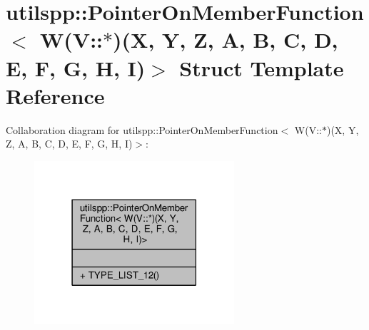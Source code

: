 \hypertarget{structutilspp_1_1PointerOnMemberFunction_3_01W_07V_1_1_5_08_07X_00_01Y_00_01Z_00_01A_00_01B_00_0bbd85fb2705c5ddb5a380fdcfc065534}{\section{utilspp\-:\-:Pointer\-On\-Member\-Function$<$ W(V\-:\-:$\ast$)(X, Y, Z, A, B, C, D, E, F, G, H, I)$>$ Struct Template Reference}
\label{structutilspp_1_1PointerOnMemberFunction_3_01W_07V_1_1_5_08_07X_00_01Y_00_01Z_00_01A_00_01B_00_0bbd85fb2705c5ddb5a380fdcfc065534}
}


Collaboration diagram for utilspp\-:\-:Pointer\-On\-Member\-Function$<$ W(V\-:\-:$\ast$)(X, Y, Z, A, B, C, D, E, F, G, H, I)$>$\-:
\nopagebreak
\begin{figure}[H]
\begin{center}
\leavevmode
\includegraphics[width=210pt]{structutilspp_1_1PointerOnMemberFunction_3_01W_07V_1_1_5_08_07X_00_01Y_00_01Z_00_01A_00_01B_00_09dfb06b5e037a19a6d27f478c36222dc}
\end{center}
\end{figure}
